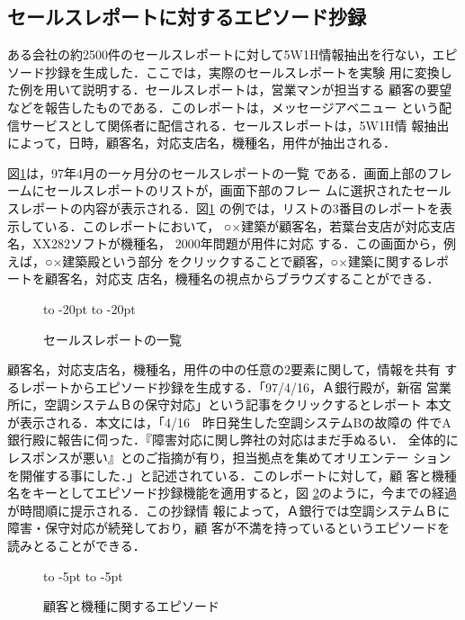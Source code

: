 \subsection{セールスレポートに対するエピソード抄録}

ある会社の約2500件のセールスレポートに対して5W1H情報抽出を行ない，エピ
ソード抄録を生成した．ここでは，実際のセールスレポートを実験
用に変換した例を用いて説明する．セールスレポートは，営業マンが担当する
顧客の要望などを報告したものである．このレポートは，メッセージアベニュー
という配信サービスとして関係者に配信される．セールスレポートは，5W1H情
報抽出によって，日時，顧客名，対応支店名，機種名，用件が抽出される．

図\ref{fig:mavenue}は，97年4月の一ヶ月分のセールスレポートの一覧
である．画面上部のフレームにセールスレポートのリストが，画面下部のフレー
ムに選択されたセールスレポートの内容が表示される．図\ref{fig:mavenue}
の例では，リストの3番目のレポートを表示している．このレポートにおいて，
○×建築が顧客名，若葉台支店が対応支店名，XX282ソフトが機種名，
2000年問題が用件に対応\break
する．この画面から，例えば，○×建築殿という部分
をクリックすることで顧客，○×建築に関するレポートを顧客名，対応支
店名，機種名の視点からブラウズすることができる．
\begin{figure}[tb]
  \vspace*{-6pt}
  \begin{center}
    \leavevmode
    \hbox to -20pt{\hss}
    \hbox to -20pt{\hss}
    \vspace*{-7pt}
    \caption{セールスレポートの一覧}
    \vspace*{-6pt}
    \label{fig:mavenue}
  \end{center}
\end{figure}

顧客名，対応支店名，機種名，用件の中の任意の2要素に関して，情報を共有
するレポートからエピソード抄録を生成する．「97/4/16，Ａ銀行殿が，新宿
営業所に，空調システムＢの保守対応」という記事をクリックするとレポート
本文が表示される．本文には，「4/16　昨日発生した空調システムBの故障の
件でA銀行殿に報告に伺った．『障害対応に関し弊社の対応はまだ手ぬるい．
全体的にレスポンスが悪い』とのご指摘が有り，担当拠点を集めてオリエンテー
ションを開催する事にした．」と記述されている．このレポートに対して，顧
客と機種名をキーとしてエピソード抄録機能を適用すると，図
\ref{episomap2}のように，今までの経過が時間順に提示される．この抄録情
報によって，Ａ銀行では空調システムＢに障害・保守対応が続発しており，顧
客が不満を持っているというエピソードを読みとることができる．
\begin{figure}[tb]
 \vspace*{-20pt}
  \begin{center}
    \leavevmode
    \hbox to -5pt{\hss}
    \hbox to -5pt{\hss}
    \vspace*{-35pt}
    \caption{顧客と機種に関するエピソード}
    \vspace*{-6pt}
    \label{episomap2}
  \end{center}
\end{figure}


